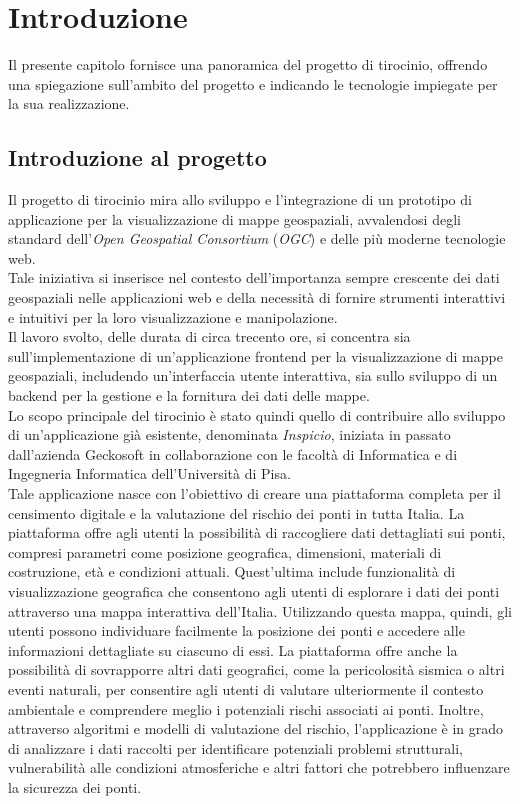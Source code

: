 \chapter{Introduzione}

Il presente capitolo fornisce una panoramica del progetto di tirocinio, offrendo una spiegazione sull'ambito del progetto e indicando le tecnologie impiegate per la sua realizzazione.

\section{Introduzione al progetto}

Il progetto di tirocinio mira allo sviluppo e l'integrazione di un prototipo di applicazione per la visualizzazione di mappe geospaziali,
avvalendosi degli standard dell'\textit{Open Geospatial Consortium} (\textit{OGC}) e delle più moderne tecnologie web.
\\Tale iniziativa si inserisce nel contesto dell'importanza sempre crescente dei dati
geospaziali nelle applicazioni web e della necessità di fornire strumenti interattivi e intuitivi per la loro visualizzazione e manipolazione.
\\Il lavoro svolto, delle durata di circa trecento ore, si concentra sia sull'implementazione di un'applicazione frontend per la visualizzazione di mappe geospaziali, includendo un'interfaccia utente
interattiva, sia sullo sviluppo di un backend per la gestione e la fornitura dei dati delle mappe.\\Lo scopo principale del tirocinio è stato quindi quello di contribuire allo sviluppo di un'applicazione già esistente, denominata \textit{Inspicio}, iniziata in passato
dall'azienda Geckosoft in collaborazione con le facoltà di Informatica e di Ingegneria Informatica dell'Università di Pisa.
\\Tale applicazione nasce con l'obiettivo di creare una piattaforma completa per il censimento digitale e la valutazione del rischio dei ponti in tutta Italia.
La piattaforma offre agli utenti la possibilità di raccogliere dati dettagliati sui ponti, compresi parametri come posizione geografica, dimensioni, materiali di costruzione, età e condizioni attuali.
Quest'ultima include funzionalità di visualizzazione geografica che consentono agli utenti di esplorare i dati dei ponti attraverso una mappa interattiva dell'Italia. Utilizzando questa mappa, quindi, gli utenti possono individuare facilmente la posizione dei ponti e accedere alle informazioni dettagliate su ciascuno di essi.
La piattaforma offre anche la possibilità di sovrapporre altri dati geografici, come la pericolosità sismica o altri eventi naturali, per consentire agli utenti di valutare ulteriormente il contesto ambientale e comprendere meglio i potenziali rischi associati ai ponti.
Inoltre, attraverso algoritmi e modelli di valutazione del rischio, l'applicazione è in grado di analizzare i dati raccolti per identificare potenziali problemi strutturali, vulnerabilità alle condizioni atmosferiche e altri fattori che potrebbero influenzare la sicurezza dei ponti.

